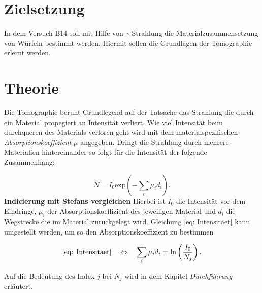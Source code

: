 \setcounter{page}{1}
\section*{Zielsetzung}

In dem Versuch B14 soll mit Hilfe von $\gamma$-Strahlung die
Materialzusammensetzung von Würfeln bestimmt werden.
Hiermit sollen die Grundlagen der Tomographie erlernt werden.

\section{Theorie}

Die Tomographie beruht Grundlegend auf der Tatsache das Strahlung die
durch ein Material propegiert an Intensität verliert.
Wie viel Intensität beim durchqueren des Materials verloren geht wird
mit dem materialspezifischen \emph{Absorptionskoeffizient} $\mu$ angegeben.
Dringt die Strahlung durch mehrere Materialien hintereinander so
folgt für die Intensität der folgende Zusammenhang:

\begin{equation}
  \label{eq: Intensitaet}
  N=I_0 \mathrm{exp}\left( - \sum_i \mu_i d_i \right).
\end{equation}
\textbf{Indicierung mit Stefans vergleichen}
Hierbei ist $I_0$ die Intensität vor dem Eindringe, $\mu_i$ der
Absorptionskoeffizient des jeweiligen Material und $d_i$ die
Wegstrecke die im Material zurückgelegt wird.
Gleichung \eqref{eq: Intensitaet} kann umgestellt werden, um so den Absorptionskoeffizient zu bestimmen

\begin{equation}
  \label{eq: I_umge}
  \eqref{eq: Intensitaet} \quad \Leftrightarrow \quad  \sum_i \mu_i d_i = \ln\left( \frac{ I_0}{N_j} \right).
\end{equation}

Auf die Bedeutung des Index $j$ bei $N_j$ wird in dem Kapitel \emph{Durchführung} erläutert.
